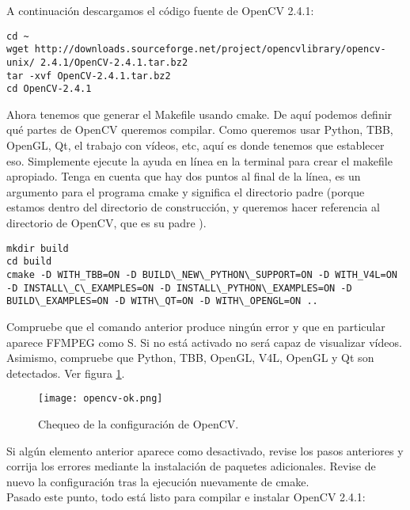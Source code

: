 A continuación descargamos el código fuente de OpenCV 2.4.1:\\

\begin{lstlisting}[style=consola]
cd ~
wget http://downloads.sourceforge.net/project/opencvlibrary/opencv-unix/ 2.4.1/OpenCV-2.4.1.tar.bz2
tar -xvf OpenCV-2.4.1.tar.bz2
cd OpenCV-2.4.1
\end{lstlisting}

Ahora tenemos que generar el Makefile usando cmake. De aquí podemos definir qué partes de OpenCV queremos compilar. Como queremos usar Python, TBB, OpenGL, Qt, el trabajo con vídeos, etc, aquí es donde tenemos que establecer eso. Simplemente ejecute la ayuda en línea en la terminal para crear el makefile apropiado. Tenga en cuenta que hay dos puntos al final de la línea, es un argumento para el programa cmake y significa el directorio padre (porque estamos dentro del directorio de construcción, y queremos hacer referencia al directorio de OpenCV, que es su padre ).\\

\begin{lstlisting}[style=consola]
mkdir build
cd build
cmake -D WITH_TBB=ON -D BUILD\_NEW\_PYTHON\_SUPPORT=ON -D WITH_V4L=ON -D INSTALL\_C\_EXAMPLES=ON -D INSTALL\_PYTHON\_EXAMPLES=ON -D BUILD\_EXAMPLES=ON -D WITH\_QT=ON -D WITH\_OPENGL=ON ..
\end{lstlisting}

Compruebe que el comando anterior produce ningún error y que en particular aparece FFMPEG como S. Si no está activado no será capaz de visualizar vídeos. Asimismo, compruebe que Python, TBB, OpenGL, V4L, OpenGL y Qt son detectados. Ver figura \ref{figura:opencv-ok}.\\

\begin{figure}[H]
  \begin{center}
    \texttt{[image: opencv-ok.png]}
  \end{center}
  \caption{Chequeo de la configuración de OpenCV.}
  \label{figura:opencv-ok}
\end{figure}

Si algún elemento anterior aparece como desactivado, revise los pasos anteriores y corrija los errores mediante la instalación de paquetes adicionales. Revise de nuevo la configuración tras la ejecución nuevamente de cmake.\\

Pasado este punto, todo está listo para compilar e instalar OpenCV 2.4.1:\\

